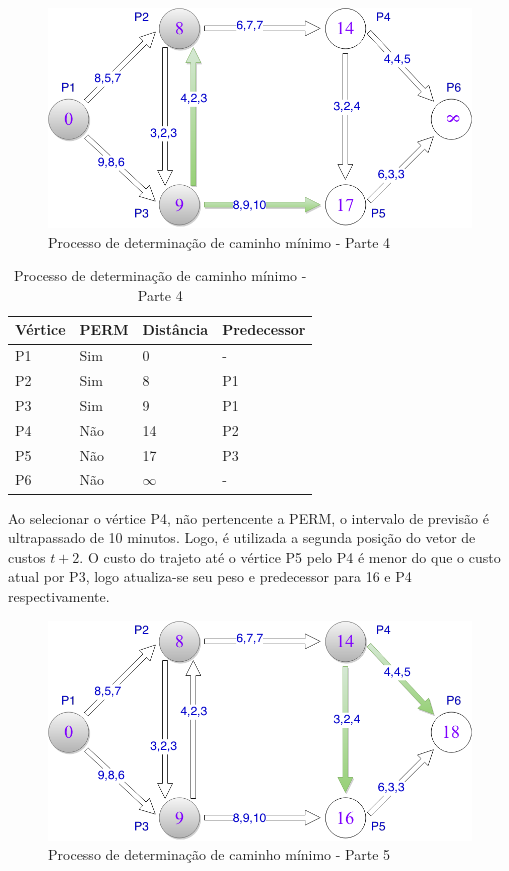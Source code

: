 \begin{figure}[htbp]
\centering
 \includegraphics[width=.50\textwidth]{chapters/fig/leo5.png}
\caption{Processo de determinação de caminho mínimo - Parte 4}
\label{fig:leo5}
\end{figure}

\begin{table}[htbp]
	\centering
	\begin{tabular}{l l l l}
	\toprule
	Vértice & PERM & Distância & Predecessor\\
	\midrule
	P1 & Sim & 0 & - \\
	P2 & Sim & 8 & P1 \\
	P3 & Sim & 9 & P1 \\
	P4 & Não & 14 & P2 \\
	P5 & Não & 17 & P3 \\
	P6 & Não & $\infty$ & - \\
	\bottomrule
	\end{tabular}
\caption{Processo de determinação de caminho mínimo - Parte 4}
 \label{tab:leotab4}
\end{table}
\FloatBarrier

Ao selecionar o vértice P4, não pertencente a PERM, o intervalo de previsão é ultrapassado
de 10 minutos. Logo, é utilizada a segunda posição do vetor de custos $t + 2$. O custo do trajeto até
o vértice P5 pelo P4 é menor do que o custo atual por P3, logo atualiza-se seu peso e predecessor
para 16 e P4 respectivamente.
\FloatBarrier
\begin{figure}[htbp]
\centering
 \includegraphics[width=.50\textwidth]{chapters/fig/leo6.png}
\caption{Processo de determinação de caminho mínimo - Parte 5}
\label{fig:leo6}
\end{figure}

